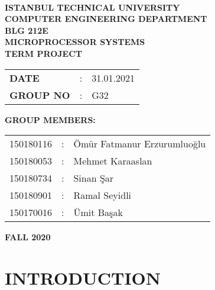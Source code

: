 \documentclass[pdftex,12pt,a4paper]{article}
\begin{document}
\begin{titlepage}
\begin{center}
\textbf{}\\
\textbf{\Large{ISTANBUL TECHNICAL UNIVERSITY}}\\
\vspace{0.5cm}
\textbf{\Large{COMPUTER ENGINEERING DEPARTMENT}}\\
\vspace{2cm}
\textbf{\Large{BLG 212E\\ MICROPROCESSOR SYSTEMS\\ TERM PROJECT}}\\
\vspace{2.8cm}
\begin{table}[ht]
\centering
\Large{
\begin{tabular}{lcl}
\textbf{DATE}  & : & 31.01.2021 \\
\textbf{GROUP NO}  & : & G32 \\
\end{tabular}}
\end{table}
\vspace{1cm}
\textbf{\Large{GROUP MEMBERS:}}\\
\begin{table}[ht]
\centering
\Large{
\begin{tabular}{rcl}
150180116  & : & Ömür Fatmanur Erzurumluoğlu \\
150180053  & : & Mehmet Karaaslan \\
150180734  & : & Sinan Şar \\
150180901  & : & Ramal Seyidli \\
150170016  & : & Ümit Başak \\
\end{tabular}}
\end{table}
\vspace{2.8cm}
\textbf{\Large{FALL 2020}}

\end{center}

\end{titlepage}

\thispagestyle{empty}
\setcounter{tocdepth}{4}
\tableofcontents
\clearpage

\setcounter{page}{1}

\section{INTRODUCTION}
\end{document}
